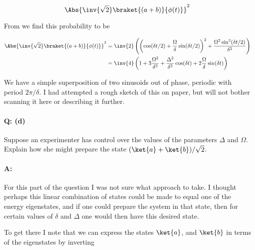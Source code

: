 {\begin{equation}\label{eqn:qmIexamPractice2008Dec:2:130}
\Abs{
\inv{\sqrt{2}}
\braket{
 (a + b)}{\phi(t)}}^2
\end{equation}

From  we find this probability to be

\begin{equation}\label{eqn:qmIexamPractice2008Dec:710}
\begin{aligned}
\Abs{
\inv{\sqrt{2}}
\braket{
 (a + b)}{\phi(t)}}^2
&=
\inv{2} \left(
\left(\cos(\delta t/2) + \frac{\Omega}{\delta} \sin(\delta t/2)\right)^2
+ \frac{ \Omega^2 \sin^2(\delta t/2)}{\delta^2}
\right) \\
&=
\inv{4} \left( 1 + 3 \frac{\Omega^2}{\delta^2} + \frac{\Delta^2}{\delta^2} \cos (\delta t) + 2 \frac{ \Omega}{\delta} \sin(\delta t) \right)
\end{aligned}
\end{equation}

We have a simple superposition of two sinusoids out of phase, periodic with period \(2 \pi/\delta\).  I had attempted a rough sketch of this on paper, but will not bother scanning it here or describing it further.

\paragraph{Q: (d)}

Suppose an experimenter has control over the values of the parameters \(\Delta\) and \(\Omega\).  Explain how she might prepare the state \((\ket{a} + \ket{b})/\sqrt{2}\).

\paragraph{A:}

For this part of the question I was not sure what approach to take.  I thought perhaps this linear combination of states could be made to equal one of the energy eigenstates, and if one could prepare the system in that state, then for certain values of \(\delta\) and \(\Delta\) one would then have this desired state.

To get there I note that we can express the states \(\ket{a}\), and \(\ket{b}\) in terms of the eigenstates by inverting

}
